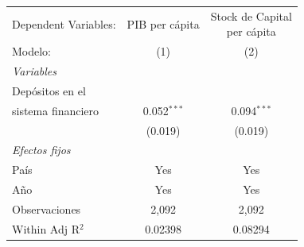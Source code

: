 \begingroup
\centering
\begin{tabular}{lcc}
   \tabularnewline \midrule \midrule
   Dependent Variables:                    & PIB per cápita & \makecell{Stock de Capital \\per cápita}\\     
   Modelo:                                  & (1)            & (2)\\  
   \midrule
   \emph{Variables}\\
   Depósitos en el \\ sistema financiero   & 0.052$^{***}$  & 0.094$^{***}$\\   
                                           & (0.019)        & (0.019)\\   
   \midrule
   \emph{Efectos fijos}\\
   País                                    & Yes            & Yes\\  
   Año                                     & Yes            & Yes\\  
   \midrule
   Observaciones                            & 2,092          & 2,092\\  
   Within Adj R$^2$                   & 0.02398        & 0.08294\\  
   \midrule \midrule
\end{tabular}
\par\endgroup
